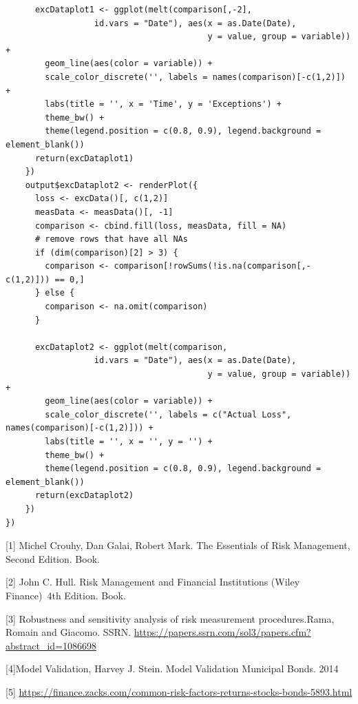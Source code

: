 \documentclass[letterpaper,11pt, oneside]{layout}
\begin{document}
\begin{spacing}{1}
\begin{lstlisting}
      excDataplot1 <- ggplot(melt(comparison[,-2], 
                  id.vars = "Date"), aes(x = as.Date(Date),
                                         y = value, group = variable)) + 
        geom_line(aes(color = variable)) + 
        scale_color_discrete('', labels = names(comparison)[-c(1,2)]) +
        labs(title = '', x = 'Time', y = 'Exceptions') +
        theme_bw() +
        theme(legend.position = c(0.8, 0.9), legend.background = element_blank())
      return(excDataplot1)
    })
    output$excDataplot2 <- renderPlot({
      loss <- excData()[, c(1,2)]
      measData <- measData()[, -1]
      comparison <- cbind.fill(loss, measData, fill = NA)
      # remove rows that have all NAs
      if (dim(comparison)[2] > 3) {
        comparison <- comparison[!rowSums(!is.na(comparison[,-c(1,2)])) == 0,]
      } else {
        comparison <- na.omit(comparison)
      }

      excDataplot2 <- ggplot(melt(comparison, 
                  id.vars = "Date"), aes(x = as.Date(Date),
                                         y = value, group = variable)) + 
        geom_line(aes(color = variable)) + 
        scale_color_discrete('', labels = c("Actual Loss", names(comparison)[-c(1,2)])) +
        labs(title = '', x = '', y = '') +
        theme_bw() +
        theme(legend.position = c(0.8, 0.9), legend.background = element_blank())
      return(excDataplot2)
    }) 
})
\end{lstlisting}
\end{spacing}



\backmatter


[1] Michel Crouhy, Dan Galai, Robert Mark. The Essentials of Risk Management, Second Edition. Book.


[2] John C. Hull. Risk Management and Financial Institutions (Wiley Finance) 4th Edition. Book.


[3] Robustness and sensitivity analysis of risk measurement procedures.Rama, Romain and Giacomo. SSRN.  
\url{https://papers.ssrn.com/sol3/papers.cfm?abstract_id=1086698}


[4]Model Validation, Harvey J. Stein. Model Validation Municipal Bonds. 2014


[5] \url{https://finance.zacks.com/common-risk-factors-returns-stocks-bonds-5893.html}




\end{document}
